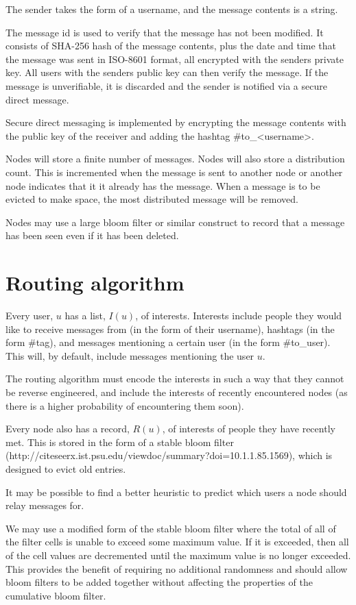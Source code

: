 \documentclass{article}
\begin{document}
The sender takes the form of a username, and the message contents is a string.

The message id is used to verify that the message has not been modified. It consists of SHA-256 hash of the message contents, plus the date and time that the message was sent in ISO-8601 format, all encrypted with the senders private key. All users with the senders public key can then verify the message. If the message is unverifiable, it is discarded and the sender is notified via a secure direct message.

Secure direct messaging is implemented by encrypting the message contents with the public key of the receiver and adding the hashtag \#to\_\textless username\textgreater.

Nodes will store a finite number of messages. Nodes will also store a distribution count. This is incremented when the message is sent to another node or another node indicates that it it already has the message. When a message is to be evicted to make space, the most distributed message will be removed.

Nodes may use a large bloom filter or similar construct to record that a message has been seen even if it has been deleted.


\section*{Routing algorithm}
Every user, $u$ has a list, $I(u)$, of interests. Interests include people they would like to receive messages from (in the form of their username), hashtags (in the form \#tag), and messages mentioning a certain user (in the form \#to\_user). This will, by default, include messages mentioning the user $u$.

The routing algorithm must encode the interests in such a way that they cannot be reverse engineered, and include the interests of recently encountered nodes (as there is a higher probability of encountering them soon).

Every node also has a record, $R(u)$, of interests of people they have recently met. This is stored in the form of a stable bloom filter (http://citeseerx.ist.psu.edu/viewdoc/summary?doi=10.1.1.85.1569), which is designed to evict old entries.

It may be possible to find a better heuristic to predict which users a node should relay messages for.

We may use a modified form of the stable bloom filter where the total of all of the filter cells is unable to exceed some maximum value. If it is exceeded, then all of the cell values are decremented until the maximum value is no longer exceeded. This provides the benefit of requiring no additional randomness and should allow bloom filters to be added together without affecting the properties of the cumulative bloom filter.
\end{document}
